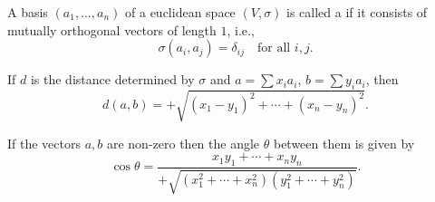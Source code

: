 A basis $(a_1, \ldots, a_n)$ of a euclidean space $(V, \sigma)$ is called a  if it consists of mutually orthogonal vectors of length $1$, i.e.,
$$\sigma(a_i, a_j) = \delta_{ij} \quad \text{for all } i, j.$$

If $d$ is the distance determined by $\sigma$ and $a = \sum x_i a_i$, $b = \sum y_i a_i$, then
$$d(a, b) = +\sqrt{(x_1 - y_1)^2 + \cdots + (x_n - y_n)^2}.$$

If the vectors $a, b$ are non-zero then the angle $\theta$ between them is given by
$$\cos \theta = \frac{x_1 y_1 + \cdots + x_n y_n}{+\sqrt{(x_1^2 + \cdots + x_n^2)(y_1^2 + \cdots + y_n^2)}}.$$
